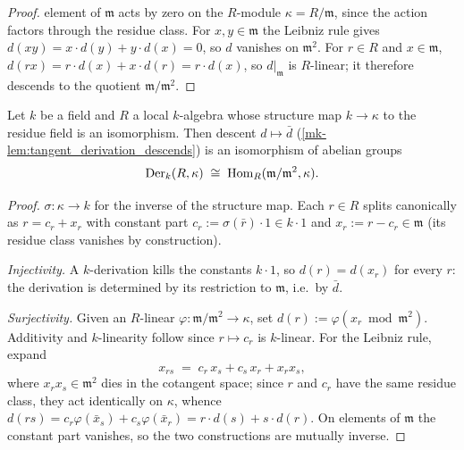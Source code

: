 \begin{proof}
  \leanokEvery element of \(\mathfrak m\) acts by zero on the \(R\)-module
  \(\kappa = R/\mathfrak m\), since the action factors through the
  residue class. For \(x, y \in \mathfrak m\) the Leibniz rule gives
  \(d(xy) = x \cdot d(y) + y \cdot d(x) = 0\), so \(d\) vanishes on
  \(\mathfrak m^2\). For \(r \in R\) and \(x \in \mathfrak m\),
  \(d(rx) = r \cdot d(x) + x \cdot d(r) = r \cdot d(x)\), so
  \(d|_{\mathfrak m}\) is \(R\)-linear; it therefore descends to the
  quotient \(\mathfrak m/\mathfrak m^2\).
\end{proof}

\begin{lemma}\label{mk-lem:tangent_derivation_cotangent_dual}
  \leanok

  Let \(k\) be a field and \(R\) a local \(k\)-algebra whose
  structure map \(k \to \kappa\) to the residue field is an
  isomorphism. Then descent \(d \mapsto \bar d\)
  (\ref{mk-lem:tangent_derivation_descends}) is an isomorphism of
  abelian groups
  \[
    \operatorname{Der}_k(R, \kappa)
    \;\cong\;
    \operatorname{Hom}_R(\mathfrak m/\mathfrak m^2, \kappa).
  \]
\end{lemma}

\begin{proof}
  \leanokWrite \(\sigma : \kappa \to k\) for the inverse of the structure
  map. Each \(r \in R\) splits canonically as
  \(r = c_r + x_r\) with constant part
  \(c_r := \sigma(\bar r) \cdot 1 \in k \cdot 1\) and
  \(x_r := r - c_r \in \mathfrak m\) (its residue class vanishes by
  construction).

  \emph{Injectivity.} A \(k\)-derivation kills the constants
  \(k \cdot 1\), so \(d(r) = d(x_r)\) for every \(r\): the derivation
  is determined by its restriction to \(\mathfrak m\), i.e.\ by
  \(\bar d\).

  \emph{Surjectivity.} Given an \(R\)-linear
  \(\varphi : \mathfrak m/\mathfrak m^2 \to \kappa\), set
  \(d(r) := \varphi(x_r \bmod \mathfrak m^2)\). Additivity and
  \(k\)-linearity follow since \(r \mapsto c_r\) is \(k\)-linear. For
  the Leibniz rule, expand
  \[
    x_{rs} \;=\; c_r\, x_s + c_s\, x_r + x_r x_s ,
  \]
  where \(x_r x_s \in \mathfrak m^2\) dies in the cotangent space;
  since \(r\) and \(c_r\) have the same residue class, they act
  identically on \(\kappa\), whence
  \(d(rs) = c_r \varphi(\bar x_s) + c_s \varphi(\bar x_r)
    = r \cdot d(s) + s \cdot d(r)\).
  On elements of \(\mathfrak m\) the constant part vanishes, so the
  two constructions are mutually inverse.
\end{proof}

